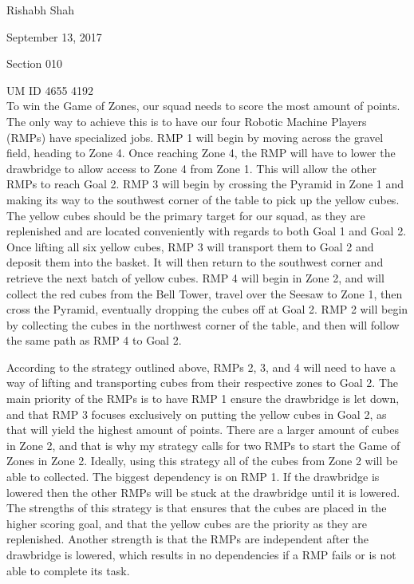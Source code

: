 \documentclass[11pt]{article}
\begin{document}
\noindent Rishabh Shah

\noindent September 13, 2017

\noindent Section 010 

\noindent UM ID 4655 4192 \\

To win the Game of Zones, our squad needs to score the most amount of points. The only way to achieve this is to have our four Robotic Machine Players (RMPs) have specialized jobs. RMP 1 will begin by moving across the gravel field, heading to Zone 4. Once reaching Zone 4, the RMP will have to lower the drawbridge to allow access to Zone 4 from Zone 1. This will allow the other RMPs to reach Goal 2. RMP 3 will begin by crossing the Pyramid in Zone 1 and making its way to the southwest corner of the table to pick up the yellow cubes. The yellow cubes should be the primary target for our squad, as they are replenished and are located conveniently with regards to both Goal 1 and Goal 2. Once lifting all six yellow cubes, RMP 3 will transport them to Goal 2 and deposit them into the basket. It will then return to the southwest corner and retrieve the next batch of yellow cubes. RMP 4 will begin in Zone 2, and will collect the red cubes from the Bell Tower, travel over the Seesaw to Zone 1, then cross the Pyramid, eventually dropping the cubes off at Goal 2. RMP 2 will begin by collecting the cubes in the northwest corner of the table, and then will follow the same path as RMP 4 to Goal 2.

According to the strategy outlined above, RMPs 2, 3, and 4 will need to have a way of lifting and transporting cubes from their respective zones to Goal 2. The main priority of the RMPs is to have RMP 1 ensure the drawbridge is let down, and that RMP 3 focuses exclusively on putting the yellow cubes in Goal 2, as that will yield the highest amount of points. There are a larger amount of cubes in Zone 2, and that is why my strategy calls for two RMPs to start the Game of Zones in Zone 2. Ideally, using this strategy all of the cubes from Zone 2 will be able to collected. The biggest dependency is on RMP 1. If the drawbridge is lowered then the other RMPs will be stuck at the drawbridge until it is lowered. The strengths of this strategy is that ensures that the cubes are placed in the higher scoring goal, and that the yellow cubes are the priority as they are replenished. Another strength is that the RMPs are independent after the drawbridge is lowered, which results in no dependencies if a RMP fails or is not able to complete its task.
\end{document}
